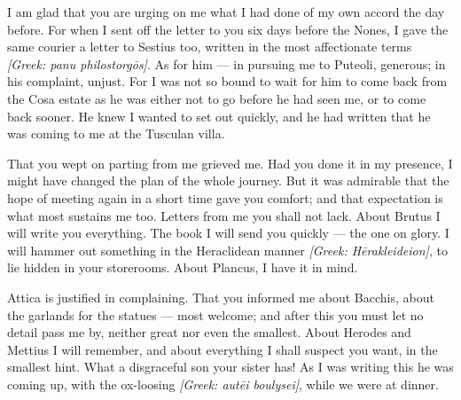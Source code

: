 

 I am glad that you are urging on me what I had done of my own accord the day before. For when I sent off the letter to you six days before the Nones, I gave the same courier a letter to Sestius too, written in the most affectionate terms \textit{[Greek: panu philostorg\=os]}. As for him --- in pursuing me to Puteoli, generous; in his complaint, unjust. For I was not so bound to wait for him to come back from the Cosa estate as he was either not to go before he had seen me, or to come back sooner. He knew I wanted to set out quickly, and he had written that he was coming to me at the Tusculan villa.

 That you wept on parting from me grieved me. Had you done it in my presence, I might have changed the plan of the whole journey. But it was admirable that the hope of meeting again in a short time gave you comfort; and that expectation is what most sustains me too. Letters from me you shall not lack. About Brutus I will write you everything. The book I will send you quickly --- the one on glory. I will hammer out something in the Heraclidean manner \textit{[Greek: H\=erakleideion]}, to lie hidden in your storerooms. About Plancus, I have it in mind.

 Attica is justified in complaining. That you informed me about Bacchis, about the garlands for the statues --- most welcome; and after this you must let no detail pass me by, neither great nor even the smallest. About Herodes and Mettius I will remember, and about everything I shall suspect you want, in the smallest hint. What a disgraceful son your sister has! As I was writing this he was coming up, with the ox-loosing \textit{[Greek: aut\=ei boulysei]}, while we were at dinner.
